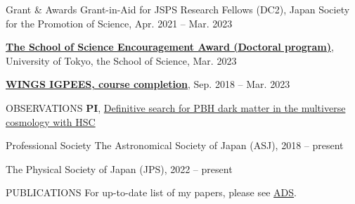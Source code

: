 \documentclass{sty/resume} %
\begin{document}

\begin{rSection}{Grant \& Awards}
  Grant-in-Aid for JSPS Research Fellows (DC2), Japan Society for the Promotion of Science, Apr. 2021 -- Mar. 2023

\textbf{\href{https://www.phys.s.u-tokyo.ac.jp/award/37776/}{The School of Science Encouragement Award (Doctoral program)}}, University of Tokyo, the School of Science, Mar. 2023

  \textbf{\href{https://www.s.u-tokyo.ac.jp/en/IGPEES/}{WINGS IGPEES, course completion}}, Sep. 2018 -- Mar. 2023
\end{rSection}

\begin{rSection}{OBSERVATIONS}
  \textbf{PI}, \href{https://subarutelescope.org/Observing/Schedule/S20B_abstract/S20B0032abst.html}{Definitive search for PBH dark matter in the multiverse cosmology with HSC}
\end{rSection}

\begin{rSection}{Professional Society}
    The Astronomical Society of Japan (ASJ), 2018 -- present

    The Physical Society of Japan (JPS), 2022 -- present
\end{rSection}

\clearpage
\begin{rSection}{PUBLICATIONS}
    For up-to-date list of my papers, please see \href{https://ui.adsabs.harvard.edu/search/filter_author_facet_hier_fq_author=AND&filter_author_facet_hier_fq_author=author_facet_hier%3A%221%2FSugiyama%2C%20S%2FSugiyama%2C%20Sunao%22&fq=%7B!type%3Daqp%20v%3D%24fq_author%7D&fq_author=(author_facet_hier%3A%221%2FSugiyama%2C%20S%2FSugiyama%2C%20Sunao%22)&q=pubdate%3A%5B2001-01%20TO%209999-12%5D%20author%3A(%22Sugiyama%2CSunao%22)&sort=date%20desc%2C%20bibcode%20desc&p_=0}{ADS}.
    \vspace{-28em}
    
    
\end{rSection}
\end{document}
